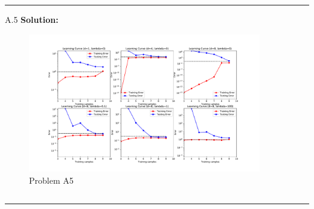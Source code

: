 \documentclass{article}
\newcommand{\1}{\mathbf{1}}
\begin{document}
\noindent\rule{\textwidth}{1pt}
A.5 {\bf Solution:}\\
    \begin{figure}[h!]
            \centering
            \includegraphics[width=0.9\textwidth]{hw1/code/Polynomial_Regression/figures/A5.pdf}
            \caption{Problem A5}
            \label{figure:a5}
    \end{figure}


\inputminted{python}{code/Polynomial_Regression/polyreg.py}
\caption{Code for A4 and A5}

\noindent\rule{\textwidth}{1pt}
\end{document}
